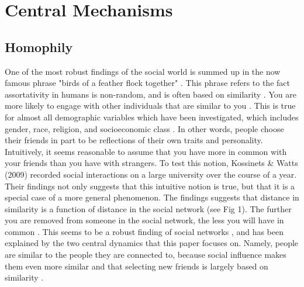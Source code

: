 \documentclass{article}
\begin{document}
\section{Central Mechanisms}
\subsection{Homophily}
One of the most robust findings of the social world is summed up in the now famous phrase "birds of a feather flock together" \cite{mcpherson_birds_2001}. This phrase refers to the fact assortativity in humans is non-random, and is often based on similarity \cite{asikainen_cumulative_2020,crandall_feedback_2008,mcpherson_birds_2001}. You are more likely to engage with other individuals that are similar to you \cite{taylor_exploring_2018}. This is true for almost all demographic variables which have been investigated, which includes gender, race, religion, and socioeconomic class \cite{asikainen_cumulative_2020,mcpherson_birds_2001}. In other words, people choose their friends in part to be reflections of their own traits and personality. 
Intuitively, it seems reasonable to assume that you have more in common with your friends than you have with strangers. To test this notion, Kossinets \& Watts (2009) recorded social interactions on a large university over the course of a year. Their findings not only suggests that this intuitive notion is true, but that it is a special case of a more general phenomenon. The findings suggests that distance in similarity is a function of distance in the social network (see Fig 1). The further you are removed from someone in the social network, the less you will have in common \cite{kossinets_origins_2009}. This seems to be a robust finding of social networks \cite{bener_empirical_2016,crandall_feedback_2008}, and has been explained by the two central dynamics that this paper focuses on. Namely, people are similar to the people they are connected to, because social influence makes them even more similar and that selecting new friends is largely based on similarity \cite{crandall_feedback_2008}. 
\end{document}
